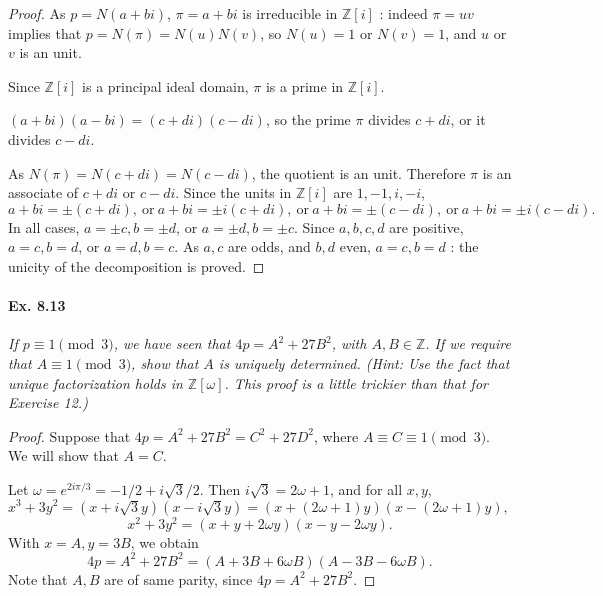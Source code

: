 \documentclass[11pt,a4paper]{article}
\newcommand{\Z}{\mathbb{Z}}
\begin{document}
{\begin{proof}
As $p = N(a+bi)$, $\pi = a+bi$ is irreducible in $\Z[i]$ : indeed $\pi = uv$ implies that $p=N(\pi) = N(u)N(v)$, so $N(u)= 1$ or $N(v) = 1$, and $u$ or $v$ is an unit.

Since $\Z[i]$ is a principal ideal domain, $\pi$ is a prime in $\Z[i]$.

$(a+bi)(a-bi) = (c+di)(c-di)$, so the prime $\pi$ divides $c+di$, or it divides $c-di$.

As $N(\pi) = N(c+di) = N(c-di)$, the quotient is an unit. Therefore $\pi$ is an associate of $c+di$ or $c-di$. Since the units in $\Z[i]$ are $1,-1,i,-i$,
$$a+bi = \pm (c+di),\ \mathrm{or}\ a+bi = \pm i (c+di), \ \mathrm{or}\ a+bi = \pm (c-di), \ \mathrm{or}\ a+bi = \pm i(c-di).$$
In all cases, $a=\pm c, b = \pm d$, or $a=\pm d, b = \pm c$.
Since $a,b,c,d$ are positive, $a=c, b=d$, or $a=d,b=c$.
As $a,c$ are odds, and $b,d$ even, $a=c, b=d$ : the unicity of the decomposition is proved.
\end{proof}

\paragraph{Ex. 8.13}

{\it If $p\equiv 1 \pmod 3$, we have seen that $4p = A^2+27B^2$, with $A,B \in \Z$. If we require that $A\equiv 1 \pmod 3$, show that $A$ is uniquely determined. (Hint: Use the fact that unique factorization holds in $\Z[\omega]$. This proof is a little trickier than that for Exercise 12.)
}

\begin{proof}
Suppose that $4p = A^2 + 27 B^2 = C^2 + 27 D^2$, where $A \equiv C \equiv 1 \pmod 3$. We will show that $A = C$.

Let $\omega = e^{2i\pi/3} = -1/2 + i \sqrt{3}/2$. Then $i\sqrt{3} = 2 \omega +1$, and for all $x,y$,
$x^3 + 3 y^2 = (x+i\sqrt{3}y)(x-i\sqrt{3}y) = (x + (2\omega+1)y)(x - (2\omega+1)y),$
$$x^2+3y^2 = (x+y+2\omega y)(x-y-2\omega y).$$
With $x =A, y = 3B$, we obtain
$$4p = A^2+27B^2 = (A+3B+6\omega B)(A-3B-6\omega B).$$
Note that $A,B$ are of same parity, since $4p = A^2 + 27 B^2$.


\end{proof}}
\end{document}
